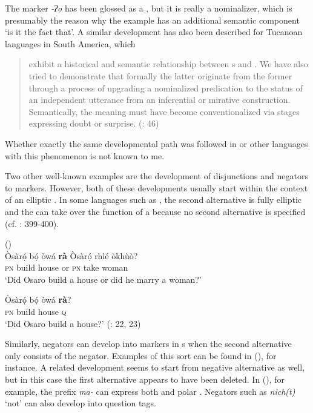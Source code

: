 \noindent The marker \textit{-ʔo} has been glossed as a , but it is really a nominalizer, which is presumably the reason why the example has an additional semantic component ‘is it the fact that’. A similar development has also been described for Tucanoan languages in South America, which

\begin{quote}
exhibit a historical and semantic relationship between s and . We have also tried to demonstrate that formally the latter originate from the former through a process of upgrading a nominalized predication to the status of an independent utterance from an inferential or mirative construction. Semantically, the  meaning must have become conventionalized via stages expressing doubt or surprise. (\citealt{vanderAuweraIdiatov2008}: 46)
\end{quote}

\noindent Whether exactly the same developmental path was followed in  or other languages with this phenomenon is not known to me.

Two other well-known examples are the development of disjunctions and negators to  markers. However, both of these developments usually start within the context of an elliptic . In some languages such as  , the second alternative is fully elliptic and the  can take over the function of a  because no second alternative is specified (cf. \citealt{Dixon2012}: 399-400).

\ea%
    \label{ex:4:31}
     ()\\
    \ea
    \gll Òsà{r}ọ́   bọ́   òwá \textbf{{rà}} Òsà{r}ọ́  rhìé  òkhùò?\\
    \textsc{pn}  build  house  or  \textsc{pn}  take  woman\\
    \glt ‘Did Osaro build a house or did he marry a woman?’

    \ex
    \gll Òsà{r}ọ́   bọ́   òwá \textbf{{rà}}?\\
    \textsc{pn}  build  house  \textsc{q}\\
    \glt ‘Did Osaro build a house?’ (\citealt{Ọmọruyi1988}: 22, 23)
    \z
    \z

Similarly, negators can develop into  markers in s when the second alternative only consists of the negator. Examples of this sort can be found in  (), for instance. A related development seems to start from negative alternative  as well, but in this case the first alternative appears to have been deleted. In  (), for example, the prefix \textit{ma-} can express both  and polar  \citep[96-101]{Watters2002}. Negators such as  \textit{nich(t)} ‘not’ can also develop into question tags.

